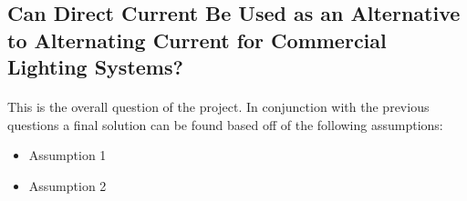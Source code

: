 \subsection{Can Direct Current Be Used as an Alternative to Alternating Current for Commercial Lighting Systems?}

\paragraph{}
This is the overall question of the project. In conjunction with the previous questions a final solution can be found based off of the following assumptions:

\begin{itemize}[noitemsep,nolistsep]
	\item Assumption 1
	\item Assumption 2
\end{itemize}
